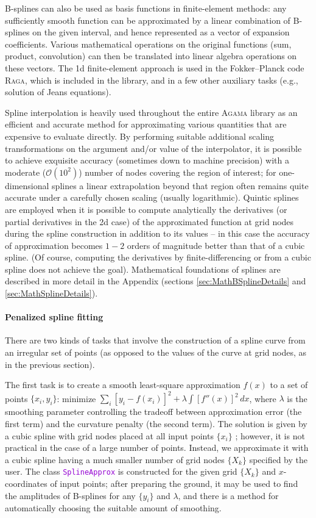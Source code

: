 \documentclass[12pt]{article}
\newcommand{\Agama}{\textsc{Agama}\xspace}
\newcommand{\Raga} {\textsc{Raga}\xspace}
\newcommand{\ttt}[1]{\textcolor{darkviolet}{\texttt{#1}}}
\begin{document}
B-splines can also be used as basis functions in finite-element methods: any sufficiently smooth function can be approximated by a linear combination of B-splines on the given interval, and hence represented as a vector of expansion coefficients. Various mathematical operations on the original functions (sum, product, convolution) can then be translated into linear algebra operations on these vectors. The 1d finite-element approach is used in the Fokker--Planck code \Raga, which is included in the library, and in a few other auxiliary tasks (e.g., solution of Jeans equations).

Spline interpolation is heavily used throughout the entire \Agama library as an efficient and accurate method for approximating various quantities that are expensive to evaluate directly. By performing suitable additional scaling transformations on the argument and/or value of the interpolator, it is possible to achieve exquisite accuracy (sometimes down to machine precision) with a moderate ($\mathcal O(10^2)$) number of nodes covering the region of interest; for one-dimensional splines a linear extrapolation beyond that region often remains quite accurate under a carefully chosen scaling (usually logarithmic). Quintic splines are employed when it is possible to compute analytically the derivatives (or partial derivatives in the 2d case) of the approximated function at grid nodes during the spline construction in addition to its values -- in this case the accuracy of approximation becomes $1-2$ orders of magnitude better than that of a cubic spline. (Of course, computing the derivatives by finite-differencing or from a cubic spline does not achieve the goal).
Mathematical foundations of splines are described in more detail in the Appendix (sections \ref{sec:MathBSplineDetails} and \ref{sec:MathSplineDetails}).

\paragraph{Penalized spline fitting}  \label{sec:SplineFitting}
There are two kinds of tasks that involve the construction of a spline curve from an irregular set of points (as opposed to the values of the curve at grid nodes, as in the previous section).

The first task is to create a smooth least-square approximation $f(x)$ to a set of points $\{x_i, y_i\}$: 
minimize $\sum_i [y_i-f(x_i)]^2 + \lambda \int [f''(x)]^2\,dx$, where $\lambda$ is the smoothing parameter controlling the tradeoff between approximation error (the first term) and the curvature penalty (the second term). The solution is given by a cubic spline with grid nodes placed at all input points $\{x_i\}$ \cite{GreenSilverman}; however, it is not practical in the case of a large number of points. Instead, we approximate it with a cubic spline having a much smaller number of grid nodes $\{X_k\}$ specified by the user. The class \ttt{SplineApprox} is constructed for the given grid  $\{X_k\}$ and $x$-coordinates of input points; after preparing the ground, it may be used to find the amplitudes of B-splines for any $\{y_i\}$ and $\lambda$, and there is a method for automatically choosing the suitable amount of smoothing.
\end{document}
